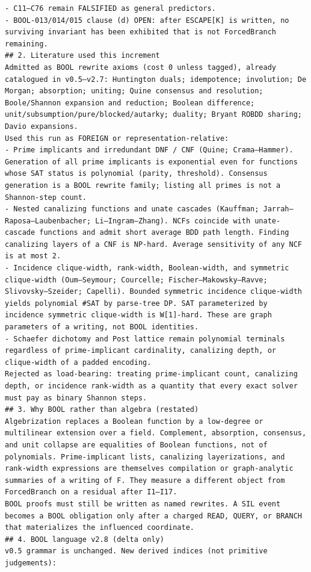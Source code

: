 \documentclass[11pt]{article}
\begin{document}
\begin{Verbatim}[breaklines=true,breakanywhere=true]
- C11–C76 remain FALSIFIED as general predictors.
- BOOL-013/014/015 clause (d) OPEN: after ESCAPE[K] is written, no surviving invariant has been exhibited that is not ForcedBranch remaining.
## 2. Literature used this increment
Admitted as BOOL rewrite axioms (cost 0 unless tagged), already catalogued in v0.5–v2.7: Huntington duals; idempotence; involution; De Morgan; absorption; uniting; Quine consensus and resolution; Boole/Shannon expansion and reduction; Boolean difference; unit/subsumption/pure/blocked/autarky; duality; Bryant ROBDD sharing; Davio expansions.
Used this run as FOREIGN or representation-relative:
- Prime implicants and irredundant DNF / CNF (Quine; Crama–Hammer). Generation of all prime implicants is exponential even for functions whose SAT status is polynomial (parity, threshold). Consensus generation is a BOOL rewrite family; listing all primes is not a Shannon-step count.
- Nested canalizing functions and unate cascades (Kauffman; Jarrah–Raposa–Laubenbacher; Li–Ingram–Zhang). NCFs coincide with unate-cascade functions and admit short average BDD path length. Finding canalizing layers of a CNF is NP-hard. Average sensitivity of any NCF is at most 2.
- Incidence clique-width, rank-width, Boolean-width, and symmetric clique-width (Oum–Seymour; Courcelle; Fischer–Makowsky–Ravve; Slivovsky–Szeider; Capelli). Bounded symmetric incidence clique-width yields polynomial #SAT by parse-tree DP. SAT parameterized by incidence symmetric clique-width is W[1]-hard. These are graph parameters of a writing, not BOOL identities.
- Schaefer dichotomy and Post lattice remain polynomial terminals regardless of prime-implicant cardinality, canalizing depth, or clique-width of a padded encoding.
Rejected as load-bearing: treating prime-implicant count, canalizing depth, or incidence rank-width as a quantity that every exact solver must pay as binary Shannon steps.
## 3. Why BOOL rather than algebra (restated)
Algebrization replaces a Boolean function by a low-degree or multilinear extension over a field. Complement, absorption, consensus, and unit collapse are equalities of Boolean functions, not of polynomials. Prime-implicant lists, canalizing layerizations, and rank-width expressions are themselves compilation or graph-analytic summaries of a writing of F. They measure a different object from ForcedBranch on a residual after I1–I17.
BOOL proofs must still be written as named rewrites. A SIL event becomes a BOOL obligation only after a charged READ, QUERY, or BRANCH that materializes the influenced coordinate.
## 4. BOOL language v2.8 (delta only)
v0.5 grammar is unchanged. New derived indices (not primitive judgements):

\end{Verbatim}
\end{document}
